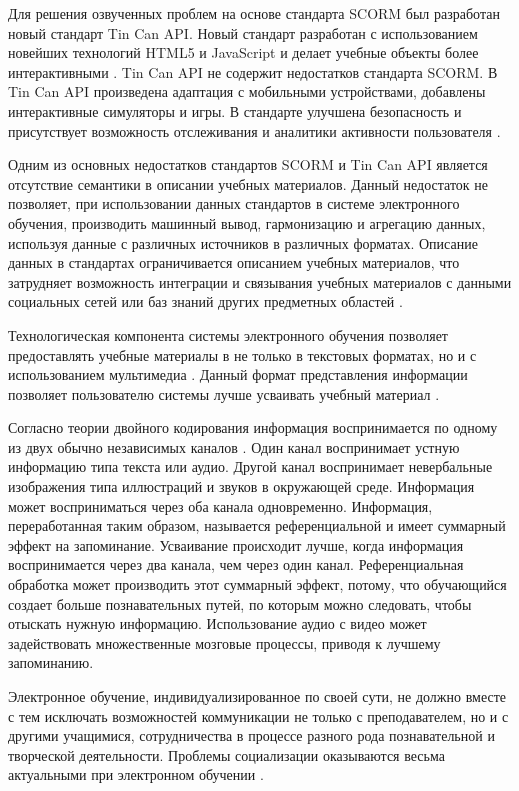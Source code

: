 Для решения озвученных проблем на основе стандарта SCORM был разработан новый стандарт Tin Can API. Новый стандарт разработан с использованием новейших технологий HTML5 и JavaScript и делает учебные объекты более интерактивными \cite{poltrack2012next}. Tin Can API не содержит недостатков стандарта SCORM. В Tin Can API произведена адаптация с мобильными устройствами, добавлены интерактивные симуляторы и игры. В стандарте улучшена безопасность и присутствует возможность отслеживания и аналитики активности пользователя \cite{regan2013training}. 

Одним из основных недостатков стандартов SCORM и Tin Can API является отсутствие семантики в описании учебных материалов. Данный недостаток не позволяет, при использовании данных стандартов в системе электронного обучения, производить машинный вывод, гармонизацию и агрегацию данных, используя данные с различных источников в различных форматах. Описание данных в стандартах ограничивается описанием учебных материалов, что затрудняет возможность интеграции и связывания учебных материалов с данными социальных сетей или баз знаний других предметных областей \cite{del2013learning}.   

Технологическая компонента системы электронного обучения позволяет предоставлять учебные материалы в не только в текстовых форматах, но и с использованием мультимедиа \cite{schlosser2009distance}. Данный формат представления информации позволяет пользователю системы лучше усваивать учебный материал \cite{moore2011distance}.

Согласно теории двойного кодирования информация воспринимается по одному из двух обычно независимых каналов \cite{monahova2013multi}. Один канал воспринимает устную информацию типа текста или аудио. Другой канал воспринимает невербальные изображения типа иллюстраций и звуков в окружающей среде. Информация может восприниматься через оба канала одновременно. Информация, переработанная таким образом, называется референциальной и имеет суммарный эффект на запоминание. Усваивание происходит лучше, когда информация воспринимается через два канала, чем через один канал. Референциальная обработка может производить этот суммарный эффект, потому, что обучающийся создает больше познавательных путей, по которым можно следовать, чтобы отыскать нужную информацию. Использование аудио с видео может задействовать множественные мозговые процессы, приводя к лучшему запоминанию.

Электронное обучение, индивидуализированное по своей сути, не должно вместе с тем исключать возможностей коммуникации не только с преподавателем, но и с другими учащимися, сотрудничества в процессе разного рода познавательной и творческой деятельности. Проблемы социализации оказываются весьма актуальными при электронном обучении \cite{hu2013revised}. 


